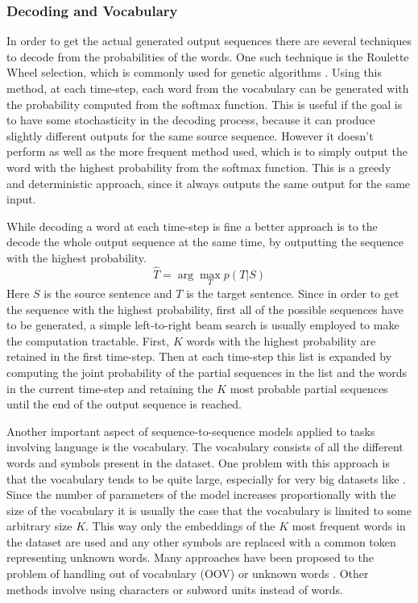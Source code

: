 \documentclass[12pt]{article}
\begin{document}
\subsubsection{Decoding and Vocabulary} \label{sssec:234}
In order to get the actual generated output sequences there are several techniques to decode from the probabilities of the words. One such technique is the Roulette Wheel selection, which is commonly used for genetic algorithms \cite{GA:1998}. Using this method, at each time-step, each word from the vocabulary can be generated with the probability computed from the softmax function. This is useful if the goal is to have some stochasticity in the decoding process, because it can produce slightly different outputs for the same source sequence. However it doesn't perform as well as the more frequent method used, which is to simply output the word with the highest probability from the softmax function. This is a greedy and deterministic approach, since it always outputs the same output for the same input.

While decoding a word at each time-step is fine a better approach is to the decode the whole output sequence at the same time, by outputting the sequence with the highest probability.
\begin{equation} \label{eq233}
\hat{T}=\arg\max_{T}p(T|S)
\end{equation}
Here \(S\) is the source sentence and \(T\) is the target sentence. Since in order to get the sequence with the highest probability, first all of the possible sequences have to be generated, a simple left-to-right beam search is usually employed to make the computation tractable. First, \(K\) words with the highest probability are retained in the first time-step. Then at each time-step this list is expanded by computing the joint probability of the partial sequences in the list and the words in the current time-step and retaining the \(K\) most probable partial sequences until the end of the output sequence is reached.

Another important aspect of sequence-to-sequence models applied to tasks involving language is the vocabulary. The vocabulary consists of all the different words and symbols present in the dataset. One problem with this approach is that the vocabulary tends to be quite large, especially for very big datasets like \cite{OpenSubtitles:2016,opensubtitles}. Since the number of parameters of the model increases proportionally with the size of the vocabulary it is usually the case that the vocabulary is limited to some arbitrary size \(K\). This way only the embeddings of the \(K\) most frequent words in the dataset are used and any other symbols are replaced with a common token representing unknown words. Many approaches have been proposed to the problem of handling out of vocabulary (OOV) or unknown words \cite{Luong:2014,Feng:2017,Jean:2014}. Other methods involve using characters \cite{Zhu:2017} or subword units \cite{Sennrich:2015} instead of words.
\end{document}
